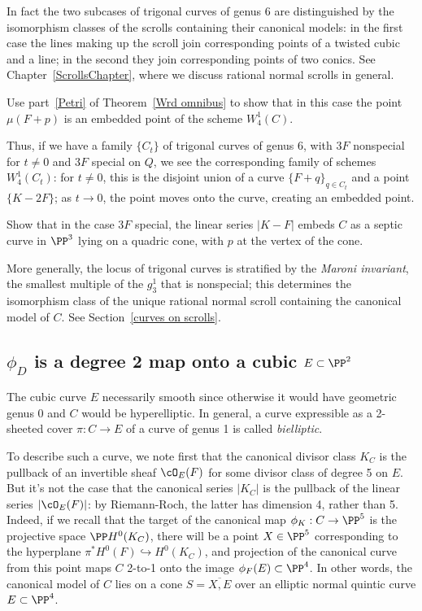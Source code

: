 In fact  the two subcases of trigonal curves of genus 6 are distinguished by the isomorphism classes of the scrolls containing their canonical models: in the first case the lines making up the scroll join corresponding points of a twisted
cubic and a line; in the second they join corresponding points of two conics.
See Chapter~\ref{ScrollsChapter}, where we discuss rational normal scrolls in general.

\begin{exercise}
Use part~\ref{Petri} of Theorem~\ref{Wrd omnibus} to show that in this case the point $\mu(F+p)$ is an embedded point of the scheme $W^1_4(C)$.
\end{exercise} 

Thus, if we have a family $\{C_t\}$ of trigonal curves of genus 6, with $3F$ nonspecial for $t \neq 0$ and $3F$ special on $Q$, we see the corresponding family of schemes $W^1_4(C_t)$: for $t \neq 0$, this is the disjoint union of a curve $\{F+q\}_{q \in C_t}$ and a point $\{K-2F\}$; as $t \to 0$, the point moves onto the curve, creating an embedded point.

\begin{exercise}
Show that in the case $3F$ special, the linear series $|K-F|$ embeds $C$ as a septic curve in $\PP^3$ lying on a quadric cone, with $p$ at the vertex of the cone.
\end{exercise}

More generally, the locus of trigonal curves is stratified by  the \emph{Maroni invariant}, the smallest multiple  of the $g^1_3$ that is nonspecial; this determines the isomorphism class of the unique rational normal scroll containing the canonical model of $C$. See Section~\ref{curves on scrolls}. 

\subsection{$\phi_{D} $ is a degree 2 map onto a cubic $E\subset \PP^{2}$}

The cubic curve $E$ necessarily smooth since otherwise it would have geometric genus 0 and $C$ would be  hyperelliptic. In general, a curve expressible as a 2-sheeted cover $\pi : C \to E$ of a curve of genus 1 is called \emph{bielliptic}.

To describe such a curve, we note first that the canonical divisor class $K_C$ is the pullback of an invertible sheaf $\cO_E(F)$ for some divisor class of degree 5 on $E$. But it's not the case that the canonical series $|K_C|$ is the pullback of the linear series $|\cO_E(F)|$: by Riemann-Roch, the latter has dimension 4, rather than 5. Indeed, if we recall that the target of the canonical map $\phi_K : C \to \PP^5$ is the projective space $\PP H^0(K_C)$, there will be a point $X \in \PP^5$ corresponding to the hyperplane $\pi^*H^0(F) \hookrightarrow H^0(K_C)$, and projection of the canonical curve from this point maps $C$ 2-to-1 onto the image $\phi_F(E) \subset \PP^4$. In other words, the canonical model of $C$ lies on a cone $S = \overline{X, E}$ over an elliptic normal quintic curve $E \subset \PP^4$.

